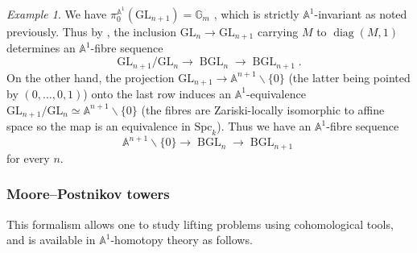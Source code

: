 \documentclass[11pt,leqno]{amsart}
\newcommand{\GL}{{\mathrm{GL}}}
\renewcommand{\1}{{\rm 1\hspace*{-0.4ex}%
\rule{0.1ex}{1.52ex}\hspace*{0.2ex}}}
\newcommand{\Spc}{\mathrm{Spc}}
\newcommand{\<}[1]{{\langle}#1 {\rangle}}
\newcommand{\Abb}{\mathbb{A}}
\newcommand{\BGL}{\operatorname{BGL}}
\newcommand{\diag}{\operatorname{diag}}
\theoremstyle{plain}
\theoremstyle{definition}
\theoremstyle{remark}
\newtheorem{ex}[thm]{Example}
\numberwithin{equation}{section}
\begin{document}
\begin{ex}\label{exe:fibre_sequence_BGLn}
We have $\pi_0^{\Abb^1}(\GL_{n+1})=\mathbb{G}_m$ \cite[Example 6.52, 2)]{morelA1AlgebraicTopologyField2012}, which is strictly $\Abb^1$-invariant as noted previously. Thus by \cite[Proposition 8.11]{morelA1AlgebraicTopologyField2012}, the inclusion $\GL_n\rightarrow\GL_{n+1}$ carrying $M$ to $\diag(M,1)$ determines an $\Abb^1$-fibre sequence \[\GL_{n+1}/\GL_n\rightarrow\BGL_n\rightarrow\BGL_{n+1}.\] On the other hand, the projection $\GL_{n+1}\rightarrow\Abb^{n+1}\smallsetminus \{0\}$ (the latter being pointed by $(0,\ldots,0,1)$) onto the last row induces an $\Abb^1$-equivalence $\GL_{n+1}/\GL_n\simeq\Abb^{n+1}\smallsetminus \{0\}$ (the fibres are Zariski-locally isomorphic to affine space so the map is an equivalence in $\Spc_k$). Thus we have an $\Abb^1$-fibre sequence 
\begin{equation}\label{eq:fibre_sequence_classifying_spaces}
\Abb^{n+1}\smallsetminus \{0\}\rightarrow\BGL_n\rightarrow\BGL_{n+1}
\end{equation}
for every $n$.
\end{ex}

\subsubsection*{Moore--Postnikov towers}

This formalism allows one to study lifting problems using cohomological tools, and is available in $\Abb^1$-homotopy theory as follows.
\end{document}
